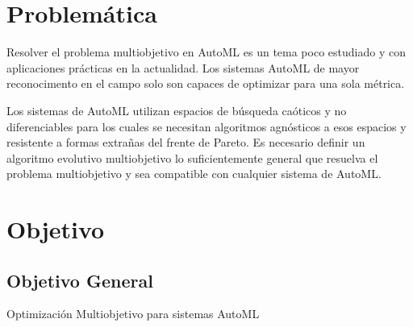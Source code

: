 \section*{Problem\'atica}
Resolver el problema multiobjetivo en AutoML es un tema poco estudiado y con aplicaciones pr\'acticas en la actualidad.
Los sistemas AutoML de mayor reconocimento en el campo solo son capaces de optimizar para una sola m\'etrica. 

Los sistemas de AutoML utilizan espacios de b\'usqueda ca\'oticos y no diferenciables para los cuales se necesitan algoritmos agn\'osticos a esos espacios y resistente a formas extra\~nas del frente de Pareto. Es necesario definir un algoritmo evolutivo multiobjetivo lo suficientemente general que resuelva el problema multiobjetivo y sea compatible con cualquier sistema de AutoML.




 
\section*{Objetivo}
\subsection*{Objetivo General}
Optimizaci\'on Multiobjetivo para sistemas AutoML
